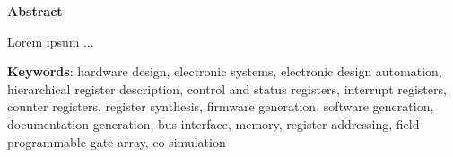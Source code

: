 \vspace*{5mm}

\textbf{\LARGE Abstract}

\vspace*{5mm}

Lorem ipsum ...

\vspace*{0.7cm}

\textbf{Keywords}:
hardware design,
electronic systems,
electronic design automation,
hierarchical register description,
control and status registers,
interrupt registers,
counter registers,
register synthesis,
firmware generation,
software generation,
documentation generation,
bus interface,
memory,
register addressing,
field-programmable gate array,
co-simulation

\newpage
